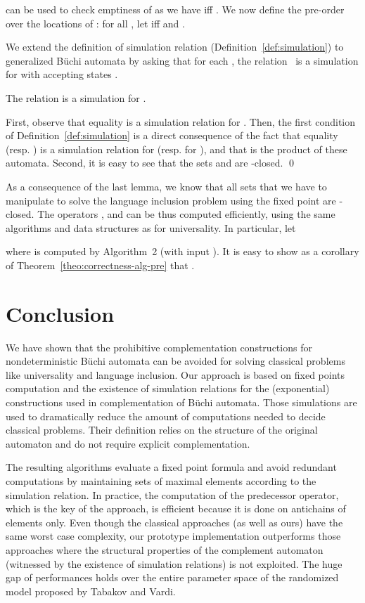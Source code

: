 \documentclass{LMCS}
\begin{document}
\noindent
can be used to check emptiness of  as we have  
iff .  
We now define the pre-order  over the locations of : 
for all , 
let  iff  and 
. 


We extend the definition of simulation relation  (Definition~\ref{def:simulation})
to generalized B\"uchi automata  by asking that for each , 
the relation~ is a simulation for  with accepting states .

\begin{lem}
The relation  is a simulation for .
\end{lem} 

\proof 
First, observe that equality is a simulation relation for . Then, the
first condition of Definition~\ref{def:simulation} is a direct consequence
of the fact that equality (resp. ) is a simulation 
relation for  (resp. for ), and that  
is the product of these automata.
Second, it is easy to see that the sets  and  are 
-closed.
\qed

As a consequence of the last lemma, we know that all sets that we
have to manipulate to solve the language inclusion problem using the
fixed point  are -closed. The operators
,  and  can be thus computed efficiently, using the same 
algorithms and data structures as for universality. In particular, let 

where
 is computed by Algorithm~2 (with input ).
It is easy to show as a corollary of Theorem~\ref{theo:correctness-alg-pre} that 
.


\section{Conclusion}\label{sec:conclusion}

We have shown that the prohibitive complementation constructions
for nondeterministic B\"uchi automata can be avoided for solving 
classical problems like universality and language inclusion. 
Our approach is based on fixed points computation and the existence of simulation relations 
for the (exponential) constructions used in complementation of 
B\"uchi automata. Those simulations are used to dramatically 
reduce the amount of computations needed to decide classical problems.
Their definition relies on the structure of the original automaton
and do not require explicit complementation. 

The resulting algorithms evaluate a fixed point formula and avoid
redundant computations by maintaining sets of maximal elements
according to the simulation relation. In practice, the computation of
the predecessor operator, which is the key of the approach, is
efficient because it is done on antichains of elements only. Even though
the classical approaches (as well as ours) have the same worst case
complexity, our prototype implementation outperforms those approaches
where the structural properties of the complement automaton (witnessed by the 
existence of simulation relations) is not exploited. The huge gap of performances holds
over the entire parameter space of the randomized model proposed by
Tabakov and Vardi.
\end{document}

